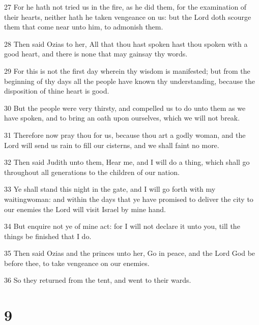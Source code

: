 \par 27 For he hath not tried us in the fire, as he did them, for the examination of their hearts, neither hath he taken vengeance on us: but the Lord doth scourge them that come near unto him, to admonish them.
\par 28 Then said Ozias to her, All that thou hast spoken hast thou spoken with a good heart, and there is none that may gainsay thy words.
\par 29 For this is not the first day wherein thy wisdom is manifested; but from the beginning of thy days all the people have known thy understanding, because the disposition of thine heart is good.
\par 30 But the people were very thirsty, and compelled us to do unto them as we have spoken, and to bring an oath upon ourselves, which we will not break.
\par 31 Therefore now pray thou for us, because thou art a godly woman, and the Lord will send us rain to fill our cisterns, and we shall faint no more.
\par 32 Then said Judith unto them, Hear me, and I will do a thing, which shall go throughout all generations to the children of our nation.
\par 33 Ye shall stand this night in the gate, and I will go forth with my waitingwoman: and within the days that ye have promised to deliver the city to our enemies the Lord will visit Israel by mine hand.
\par 34 But enquire not ye of mine act: for I will not declare it unto you, till the things be finished that I do.
\par 35 Then said Ozias and the princes unto her, Go in peace, and the Lord God be before thee, to take vengeance on our enemies.
\par 36 So they returned from the tent, and went to their wards.

\chapter{9}

